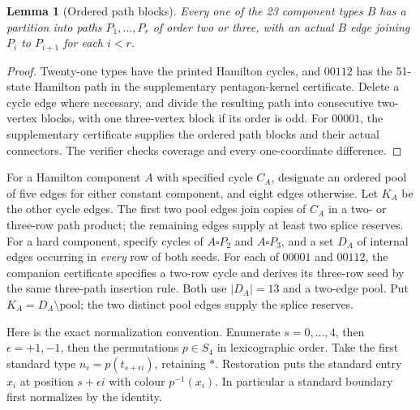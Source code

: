 \documentclass[11pt]{article}
\newtheorem{lemma}[theorem]{Lemma}
\theoremstyle{remark}
\numberwithin{equation}{section}
\numberwithin{table}{section}
\begin{document}
\begin{lemma}[Ordered path blocks]\label{lem:pentagon-path-blocks}
Every one of the 23 component types $B$ has a partition into paths
$P_1,\ldots,P_r$ of order two or three, with an actual $B$ edge
joining $P_i$ to $P_{i+1}$ for each $i<r$.
\end{lemma}
\begin{proof}
Twenty-one types have the printed Hamilton cycles, and $00112$ has
the 51-state Hamilton path in the supplementary pentagon-kernel certificate.
Delete a cycle edge where necessary, and divide the resulting path
into consecutive two-vertex blocks, with one three-vertex block if
its order is odd. For $00001$, the supplementary certificate supplies the ordered path blocks and their actual connectors.  The verifier checks coverage and every one-coordinate difference.
\end{proof}

For a Hamilton component $A$ with specified cycle $C_A$, designate an
ordered pool of five edges for either constant component, and eight
edges otherwise. Let $K_A$ be the other cycle edges. The first two
pool edges join copies of $C_A$ in a two- or three-row path product;
the remaining edges supply at least two splice reserves.
For a hard component, specify cycles of $A\square P_2$ and
$A\square P_3$, and a set $D_A$ of internal edges occurring in
\emph{every} row of both seeds. For each of $00001$ and $00112$,
the companion certificate specifies a two-row cycle and derives its three-row
seed by the same three-path insertion rule. Both use $|D_A|=13$
and a two-edge pool. Put $K_A=D_A\setminus\text{pool}$; the two
distinct pool edges supply the splice reserves.

Here is the exact normalization convention. Enumerate $s=0,\ldots,4$,
then $\epsilon=+1,-1$, then the permutations $p\in S_4$ in lexicographic
order. Take the first standard type
$n_i=p(t_{s+\epsilon i})$, retaining $\ast$. Restoration puts the
standard entry $x_i$ at position $s+\epsilon i$ with colour $p^{-1}(x_i)$.
In particular a standard boundary first normalizes by the identity.
\end{document}
